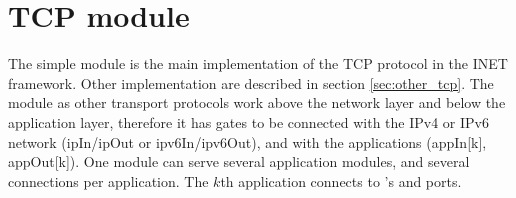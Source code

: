 %
%
%
%
%
%
%
%
%
%


\section{TCP module}

The  simple module is the main implementation of the TCP protocol in the INET framework.
Other implementation are described in section \ref{sec:other_tcp}.
The  module as other transport protocols work above the network layer and below the application
layer, therefore it has gates to be connected with the IPv4 or IPv6 network (ipIn/ipOut or ipv6In/ipv6Out),
and with the applications (appIn[k], appOut[k]).
One  module can serve several application modules, and several
connections per application. The $k$th application connects to 's
 and  ports.

